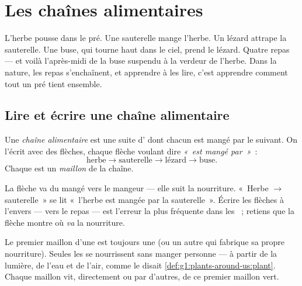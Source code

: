 \chapter{Les chaînes alimentaires}\label{ch:g3:food-chains}

L'herbe pousse dans le pré. Une sauterelle mange l'herbe. Un lézard
attrape la sauterelle. Une buse, qui tourne haut dans le ciel, prend
le lézard. Quatre repas --- et voilà l'après-midi de la buse
suspendu à la verdeur de l'herbe. Dans la nature, les repas
s'enchaînent, et apprendre à les lire, c'est apprendre comment tout
un pré tient ensemble.

\section{Lire et écrire une chaîne alimentaire}

\begin{definition}\label{def:g3:food-chains:chain}
Une \emph{chaîne alimentaire} est une
suite d' dont chacun est mangé par le suivant. On
l'écrit avec des flèches, chaque flèche voulant dire \emph{«~est
mangé par~»}~:
\[
\text{herbe} \longrightarrow \text{sauterelle}
\longrightarrow \text{lézard} \longrightarrow \text{buse}.
\]
Chaque  est un \emph{maillon} de la chaîne.
\end{definition}

\begin{remark}\label{rem:g3:food-chains:arrow}
La flèche va du mangé vers le mangeur --- elle suit la nourriture.
«~Herbe $\rightarrow$ sauterelle~» se lit «~l'herbe est mangée par
la sauterelle~». Écrire les flèches à l'envers --- vers le repas ---
est l'erreur la plus fréquente dans les ~;
retiens que la flèche montre où \emph{va} la nourriture.
\end{remark}

\begin{proposition}\label{prop:g3:food-chains:start}
Le premier maillon d'une  est toujours une 
(ou un autre  qui fabrique sa propre nourriture). Seules
les  se nourrissent sans manger personne --- à partir de la
lumière, de l'eau et de l'air, comme le disait
\cref{def:g1:plants-around-us:plant}. Chaque maillon  vit,
directement ou par d'autres, de ce premier maillon vert.
\end{proposition}
\admitted

